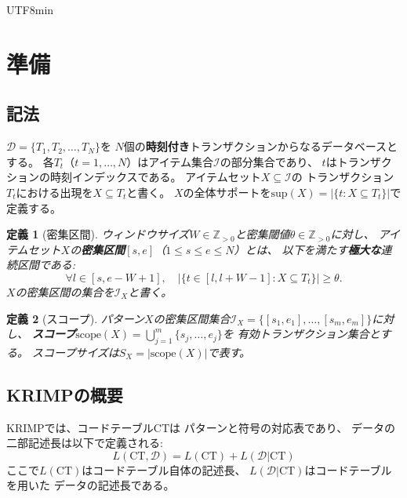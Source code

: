 \documentclass[11pt,a4paper]{article}
\newtheorem{definition}{定義}
\begin{document}
\begin{CJK}{UTF8}{min}
\section{準備}\label{sec:prelim}

\subsection{記法}

$\mathcal{D} = \{T_1, T_2, \ldots, T_N\}$を
$N$個の\textbf{時刻付き}トランザクションからなるデータベースとする。
各$T_t$（$t = 1, \ldots, N$）はアイテム集合$\mathcal{I}$の部分集合であり、
$t$はトランザクションの時刻インデックスである。
アイテムセット$X \subseteq \mathcal{I}$の
トランザクション$T_t$における出現を$X \subseteq T_t$と書く。
$X$の全体サポートを$\text{sup}(X) = |\{t : X \subseteq T_t\}|$で定義する。

\begin{definition}[密集区間]\label{def:dense_interval}
ウィンドウサイズ$W \in \mathbb{Z}_{>0}$と密集閾値$\theta \in \mathbb{Z}_{>0}$に対し、
アイテムセット$X$の\textbf{密集区間}$[s, e]$（$1 \leq s \leq e \leq N$）とは、
以下を満たす\textbf{極大な}連続区間である:
\begin{equation}\label{eq:dense_def}
  \forall l \in [s, e{-}W{+}1],\quad
  |\{t \in [l, l{+}W{-}1] : X \subseteq T_t\}| \geq \theta.
\end{equation}
$X$の密集区間の集合を$\mathcal{I}_X$と書く。
\end{definition}

\begin{definition}[スコープ]\label{def:scope}
パターン$X$の密集区間集合$\mathcal{I}_X = \{[s_1,e_1], \ldots, [s_m,e_m]\}$に対し、
\textbf{スコープ}$\text{scope}(X) = \bigcup_{j=1}^{m} \{s_j, \ldots, e_j\}$を
有効トランザクション集合とする。
スコープサイズは$S_X = |\text{scope}(X)|$で表す。
\end{definition}

\subsection{KRIMPの概要}

KRIMPでは、コードテーブル$\text{CT}$は
パターンと符号の対応表であり、
データの二部記述長は以下で定義される:
\begin{equation}\label{eq:krimp}
  L(\text{CT}, \mathcal{D}) = L(\text{CT}) + L(\mathcal{D} | \text{CT})
\end{equation}
ここで$L(\text{CT})$はコードテーブル自体の記述長、
$L(\mathcal{D}|\text{CT})$はコードテーブルを用いた
データの記述長である。


\end{CJK}
\end{document}
